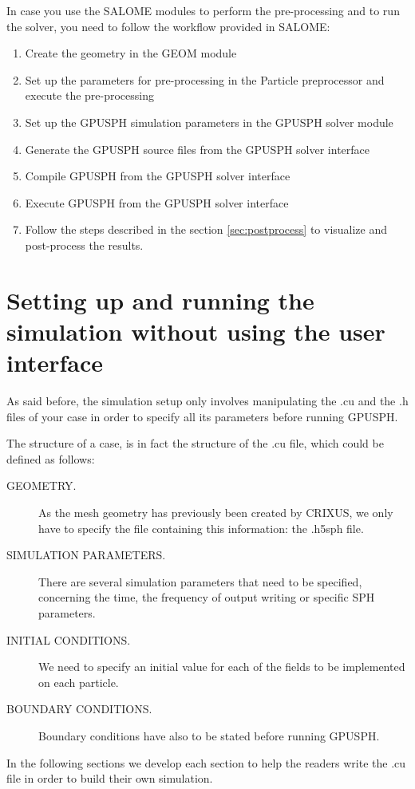 \documentclass{../GPUSPHtemplate}
\begin{document}
In case you use the SALOME modules to perform the pre-processing and to run
the solver, you need to follow the workflow provided in SALOME:
\begin{enumerate}
\item Create the geometry in the GEOM module
\item Set up the parameters for pre-processing in the Particle preprocessor and execute the pre-processing
\item Set up the GPUSPH simulation parameters in the GPUSPH solver module
\item Generate the GPUSPH source files from the GPUSPH solver interface
\item Compile GPUSPH from the GPUSPH solver interface
\item Execute GPUSPH from the GPUSPH solver interface
\item Follow the steps described in the section \ref{sec:postprocess} 
  to visualize and post-process the results.
\end{enumerate}



\section{Setting up and running the simulation without using the user interface}
\label{sec:setup-noui}

As said before, the simulation setup only involves manipulating the .cu and the .h 
files of your case in order to specify all its parameters before running GPUSPH. 

The structure of a case, is in fact the structure of the .cu file, 
which could be defined as follows:
\begin{description}
\item[GEOMETRY.] As the mesh geometry has previously been 
created by CRIXUS, we only have to specify the file 
containing this information: the .h5sph file.
\item[SIMULATION PARAMETERS.] There are several simulation 
parameters that need to be specified, concerning the time, 
the frequency of output writing or specific SPH parameters.
\item[INITIAL CONDITIONS.] We need to specify an initial 
value for each of the fields to be implemented on each particle.
\item[BOUNDARY CONDITIONS.] Boundary conditions 
have also to be stated before running GPUSPH.
\end{description}
In the following sections we develop each section to help 
the readers write the .cu file in order to build their own simulation.
\end{document}
